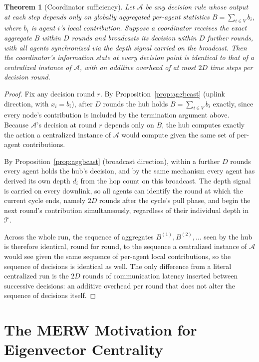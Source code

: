 \documentclass[letterpaper]{article} %
\newtheorem{theorem}{Theorem}
\begin{document}
\begin{theorem}[Coordinator sufficiency]
\label{thm:coordinator}
Let $\mathcal{A}$ be any decision rule whose output at each step depends
only on globally aggregated per-agent statistics $B = \sum_{i \in V} b_i$,
where $b_i$ is agent $i$'s local contribution. Suppose a coordinator
receives the exact aggregate $B$ within $D$ rounds and broadcasts its
decision within $D$ further rounds, with all agents synchronized via the
depth signal carried on the broadcast. Then the coordinator's information
state at every decision point is identical to that of a centralized
instance of $\mathcal{A}$, with an additive overhead of at most $2D$ time
steps per decision round.
\end{theorem}

\begin{proof}
Fix any decision round $r$. By Proposition~\ref{prop:aggbcast} (uplink
direction, with $x_i = b_i$), after $D$ rounds the hub holds $B =
\sum_{i\in V} b_i$ exactly, since every node's contribution is included by
the termination argument above.
Because $\mathcal{A}$'s decision at round $r$ depends only on $B$, the hub
computes exactly the action a centralized instance of $\mathcal{A}$ would
compute given the same set of per-agent contributions.

By Proposition~\ref{prop:aggbcast} (broadcast direction), within a further
$D$ rounds every agent holds the hub's decision, and by the same mechanism
every agent has derived its own depth $d_i$ from the hop count on this
broadcast. The depth signal is carried on every downlink, so all agents can
identify the round at which the current cycle ends, namely $2D$ rounds
after the cycle's pull phase, and begin the next round's contribution
simultaneously, regardless of their individual depth in $\mathcal{T}$.

Across the whole run, the sequence of aggregates $B^{(1)}, B^{(2)},
\ldots$ seen by the hub is therefore identical, round for round, to the
sequence a centralized instance of $\mathcal{A}$ would see given the same
sequence of per-agent local contributions, so the sequence of decisions is
identical as well. The only difference from a literal centralized run is
the $2D$ rounds of communication latency inserted between successive
decisions: an additive overhead per round that does not alter the sequence
of decisions itself.
\end{proof}

\section{The MERW Motivation for Eigenvector Centrality}
\label{sec:merw}
\end{document}
